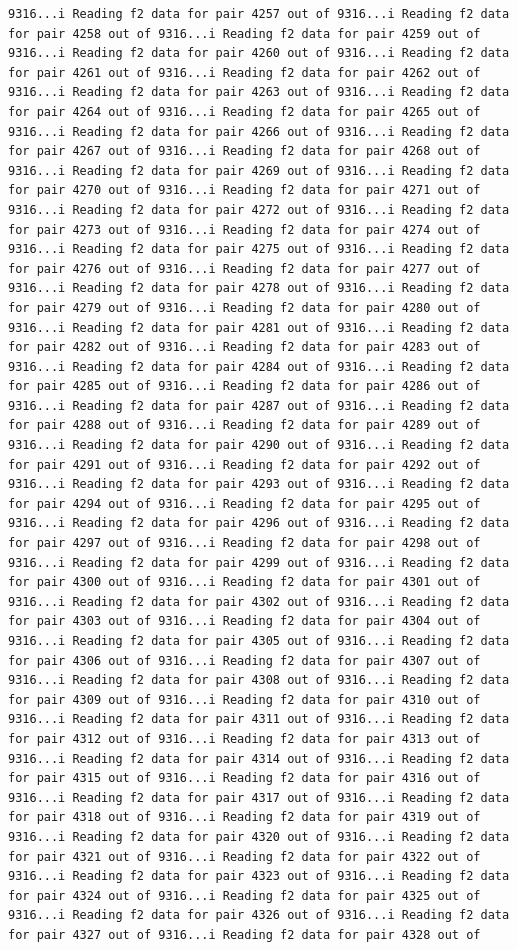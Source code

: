 \documentclass[
]{article}
\begin{document}
\begin{verbatim}
9316...i Reading f2 data for pair 4257 out of 9316...i Reading f2 data for pair 4258 out of 9316...i Reading f2 data for pair 4259 out of 9316...i Reading f2 data for pair 4260 out of 9316...i Reading f2 data for pair 4261 out of 9316...i Reading f2 data for pair 4262 out of 9316...i Reading f2 data for pair 4263 out of 9316...i Reading f2 data for pair 4264 out of 9316...i Reading f2 data for pair 4265 out of 9316...i Reading f2 data for pair 4266 out of 9316...i Reading f2 data for pair 4267 out of 9316...i Reading f2 data for pair 4268 out of 9316...i Reading f2 data for pair 4269 out of 9316...i Reading f2 data for pair 4270 out of 9316...i Reading f2 data for pair 4271 out of 9316...i Reading f2 data for pair 4272 out of 9316...i Reading f2 data for pair 4273 out of 9316...i Reading f2 data for pair 4274 out of 9316...i Reading f2 data for pair 4275 out of 9316...i Reading f2 data for pair 4276 out of 9316...i Reading f2 data for pair 4277 out of 9316...i Reading f2 data for pair 4278 out of 9316...i Reading f2 data for pair 4279 out of 9316...i Reading f2 data for pair 4280 out of 9316...i Reading f2 data for pair 4281 out of 9316...i Reading f2 data for pair 4282 out of 9316...i Reading f2 data for pair 4283 out of 9316...i Reading f2 data for pair 4284 out of 9316...i Reading f2 data for pair 4285 out of 9316...i Reading f2 data for pair 4286 out of 9316...i Reading f2 data for pair 4287 out of 9316...i Reading f2 data for pair 4288 out of 9316...i Reading f2 data for pair 4289 out of 9316...i Reading f2 data for pair 4290 out of 9316...i Reading f2 data for pair 4291 out of 9316...i Reading f2 data for pair 4292 out of 9316...i Reading f2 data for pair 4293 out of 9316...i Reading f2 data for pair 4294 out of 9316...i Reading f2 data for pair 4295 out of 9316...i Reading f2 data for pair 4296 out of 9316...i Reading f2 data for pair 4297 out of 9316...i Reading f2 data for pair 4298 out of 9316...i Reading f2 data for pair 4299 out of 9316...i Reading f2 data for pair 4300 out of 9316...i Reading f2 data for pair 4301 out of 9316...i Reading f2 data for pair 4302 out of 9316...i Reading f2 data for pair 4303 out of 9316...i Reading f2 data for pair 4304 out of 9316...i Reading f2 data for pair 4305 out of 9316...i Reading f2 data for pair 4306 out of 9316...i Reading f2 data for pair 4307 out of 9316...i Reading f2 data for pair 4308 out of 9316...i Reading f2 data for pair 4309 out of 9316...i Reading f2 data for pair 4310 out of 9316...i Reading f2 data for pair 4311 out of 9316...i Reading f2 data for pair 4312 out of 9316...i Reading f2 data for pair 4313 out of 9316...i Reading f2 data for pair 4314 out of 9316...i Reading f2 data for pair 4315 out of 9316...i Reading f2 data for pair 4316 out of 9316...i Reading f2 data for pair 4317 out of 9316...i Reading f2 data for pair 4318 out of 9316...i Reading f2 data for pair 4319 out of 9316...i Reading f2 data for pair 4320 out of 9316...i Reading f2 data for pair 4321 out of 9316...i Reading f2 data for pair 4322 out of 9316...i Reading f2 data for pair 4323 out of 9316...i Reading f2 data for pair 4324 out of 9316...i Reading f2 data for pair 4325 out of 9316...i Reading f2 data for pair 4326 out of 9316...i Reading f2 data for pair 4327 out of 9316...i Reading f2 data for pair 4328 out of 
\end{verbatim}
\end{document}

